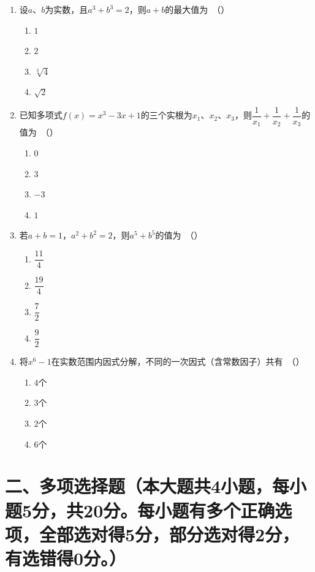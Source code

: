 \documentclass[12pt, a4paper]{ctexart}
\begin{document}
\begin{enumerate}
\item 设$a$、$b$为实数，且$a^3+b^3=2$，则$a+b$的最大值为\ （\quad）
\begin{enumerate}[label=\Alph*., itemsep=0pt, topsep=2pt]
\item $1$ \quad \item $2$ \quad \item $\sqrt[3]{4}$ \quad \item $\sqrt{2}$
\end{enumerate}

\item 已知多项式$f(x)=x^3-3x+1$的三个实根为$x_1$、$x_2$、$x_3$，则$\dfrac{1}{x_1}+\dfrac{1}{x_2}+\dfrac{1}{x_3}$的值为\ （\quad）
\begin{enumerate}[label=\Alph*., itemsep=0pt, topsep=2pt]
\item $0$ \quad \item $3$ \quad \item $-3$ \quad \item $1$
\end{enumerate}

\item 若$a+b=1$，$a^2+b^2=2$，则$a^5+b^5$的值为\ （\quad）
\begin{enumerate}[label=\Alph*., itemsep=0pt, topsep=2pt]
\item $\dfrac{11}{4}$ \quad \item $\dfrac{19}{4}$ \quad \item $\dfrac{7}{2}$ \quad \item $\dfrac{9}{2}$
\end{enumerate}

\item 将$x^6-1$在实数范围内因式分解，不同的一次因式（含常数因子）共有\ （\quad）
\begin{enumerate}[label=\Alph*., itemsep=0pt, topsep=2pt]
\item $4$个 \quad \item $3$个 \quad \item $2$个 \quad \item $6$个
\end{enumerate}

\end{enumerate}

\section*{二、多项选择题（本大题共4小题，每小题5分，共20分。每小题有多个正确选项，全部选对得5分，部分选对得2分，有选错得0分。）}
\end{document}
